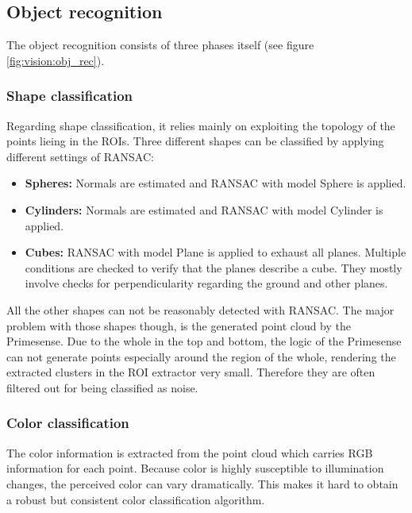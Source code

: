 \subsection{Object recognition} 
 
The object recognition consists of three phases itself (see figure \ref{fig:vision:obj_rec}).

\subsubsection{Shape classification}

Regarding shape classification, it relies mainly on exploiting the topology of the points lieing in the ROIs.
Three different shapes can be classified by applying different settings of RANSAC:
\begin{itemize}
\item \textbf{Spheres:}
Normals are estimated and RANSAC with model Sphere is applied.

\item \textbf{Cylinders:}
Normals are estimated and RANSAC with model Cylinder is applied.

\item \textbf{Cubes:}
RANSAC with model Plane is applied to exhaust all planes.
Multiple conditions are checked to verify that the planes describe a cube.
They mostly involve checks for perpendicularity regarding the ground and other planes.

\end{itemize}

All the other shapes can not be reasonably detected with RANSAC.
The major problem with those shapes though, is the generated point cloud by the Primesense.
Due to the whole in the top and bottom, the logic of the Primesense can not generate points especially around the region of the whole,
rendering the extracted clusters in the ROI extractor very small. 
Therefore they are often filtered out for being classified as noise.

\subsubsection{Color classification}

The color information is extracted from the point cloud which carries RGB information for each point.
Because color is highly susceptible to illumination changes, the perceived color can vary dramatically.
This makes it hard to obtain a robust but consistent color classification algorithm.

